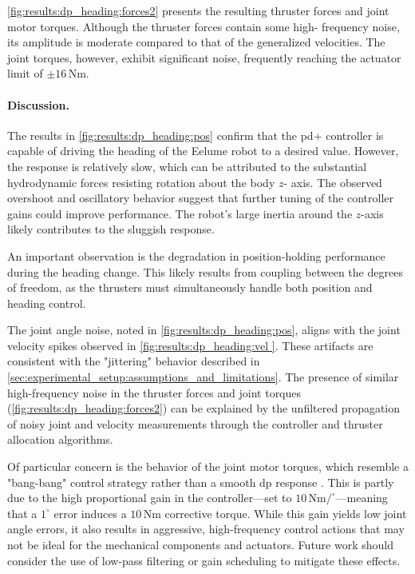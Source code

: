\autoref{fig:results:dp_heading:forces2} presents the resulting thruster 
forces and joint motor torques. Although the thruster forces contain some high-
frequency noise, its amplitude is moderate compared to that of the generalized 
velocities. The joint torques, however, exhibit significant noise, frequently 
reaching the actuator limit of \(\pm16\,\mathrm{Nm}\).

\paragraph{Discussion.}

The results in \autoref{fig:results:dp_heading:pos} confirm that the \gls{pd+} 
controller is capable of driving the heading of the Eelume robot to a desired 
value. However, the response is relatively slow, which can be attributed to 
the substantial hydrodynamic forces resisting rotation about the body \(z\)-
axis. The observed overshoot and oscillatory behavior suggest that further 
tuning of the controller gains could improve performance. The robot's large 
inertia around the \(z\)-axis likely contributes to the sluggish response.

An important observation is the degradation in position-holding performance 
during the heading change. This likely results from coupling between the 
degrees of freedom, as the thrusters must simultaneously handle both position 
and heading control.

The joint angle noise, noted in \autoref{fig:results:dp_heading:pos}, aligns 
with the joint velocity spikes observed in \autoref{fig:results:dp_heading:vel
}. These artifacts are consistent with the "jittering" behavior described in
\autoref{sec:experimental_setup:assumptions_and_limitations}. The presence of 
similar high-frequency noise in the thruster forces and joint torques
(\autoref{fig:results:dp_heading:forces2}) can be explained by the unfiltered 
propagation of noisy joint and velocity measurements through the controller 
and thruster allocation algorithms.

Of particular concern is the behavior of the joint motor torques, which 
resemble a "bang-bang" control strategy rather than a smooth \gls{dp} response
. This is partly due to the high proportional gain in the controller—set to
\(10\,\mathrm{Nm}/^\circ\)—meaning that a \(1^\circ\) error induces a 
\(10\,\mathrm{Nm}\) corrective torque. While this gain yields low joint angle 
errors, it also results in aggressive, high-frequency control actions that may 
not be ideal for the mechanical components and actuators. Future work should 
consider the use of low-pass filtering or gain scheduling to mitigate these effects.

